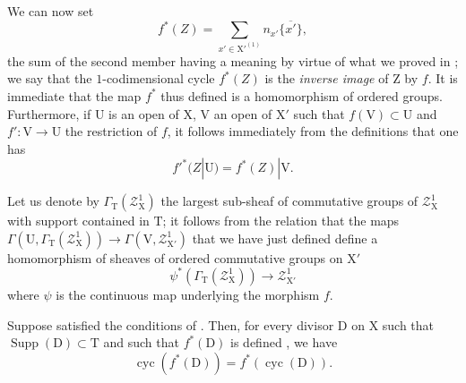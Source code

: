 \begin{env}[21.10.3]
\label{IV.21.10.3}
We can now set
\[
  f^*(Z)=\sum_{x'\in\mathrm{X}'^{(1)}} n_{x'}\overline{\{x'\}},
\]
the sum of the second member having a meaning by virtue of what we proved in ; we say that the $1$-codimensional cycle $f^*(Z)$ is the \emph{inverse image} of $\mathrm{Z}$ by $f$.
It is immediate that the map $f^*$ thus defined is a homomorphism of ordered groups.
Furthermore, if $\mathrm{U}$ is an open of $\mathrm{X}$, $\mathrm{V}$ an open of $\mathrm{X}'$ such that $f(\mathrm{V})\subset\mathrm{U}$ and $f':\mathrm{V}\to\mathrm{U}$ the restriction of $f$, it follows immediately from the definitions that one has
\[
\label{IV.21.10.3.1}
  f'^*(Z|\mathrm{U})=f^*(Z)|\mathrm{V}.
  \tag{21.10.3.1}
\]

Let us denote by $\Gamma_{\mathrm{T}}(\mathscr{Z}^1_{\mathrm{X}})$ the largest sub-sheaf of commutative groups of $\mathscr{Z}^1_{\mathrm{X}}$ with support contained in $\mathrm{T}$; it follows from the relation  that the maps $\Gamma(\mathrm{U},\Gamma_{\mathrm{T}}(\mathscr{Z}^1_{\mathrm{X}}))\to\Gamma(\mathrm{V},\mathscr{Z}^1_{\mathrm{X}'})$ that we have just defined define a homomorphism of sheaves of ordered commutative groups on $\mathrm{X}'$
\[
  \psi^*(\Gamma_{\mathrm{T}}(\mathscr{Z}^1_{\mathrm{X}}))\to\mathscr{Z}^1_{\mathrm{X}'}
\]
where $\psi$ is the continuous map underlying the morphism $f$.
\end{env}

\begin{proposition}[21.10.4]
\label{IV.21.10.4}
Suppose satisfied the conditions of .
Then, for every divisor $\mathrm{D}$ on $\mathrm{X}$ such that $\operatorname{Supp}(\mathrm{D})\subset\mathrm{T}$ and such that $f^*(\mathrm{D})$ is defined , we have
\[
\label{IV.21.10.4.1}
  \operatorname{cyc}(f^*(\mathrm{D}))=f^*(\operatorname{cyc}(\mathrm{D})).
  \tag{21.10.4.1}
\]
\end{proposition}


